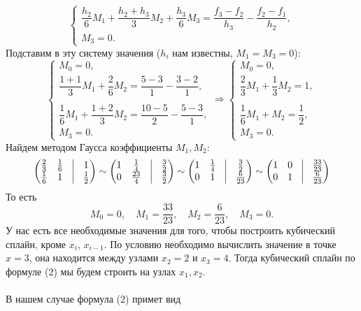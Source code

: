 \documentclass[a4paper, 12pt]{article}
\begin{document}
\begin{enumerate}
$$\begin{cases}
			\dfrac{h_2}{6}M_{1} + \dfrac{h_2 + h_{3}}{3}M_2 + \dfrac{h_{3}}{6}M_{3} = \dfrac{f_{3} - f_2}{h_{3}} - \dfrac{f_2 - f_{1}}{h_2},\\
			M_3 = 0.
		\end{cases}$$
		Подставим в эту систему значения ($h_i$ нам известны, $M_1 = M_3 = 0$):
		$$\begin{cases}
			M_0 = 0,\\
			\dfrac{1 + 1}{3}M_1 + \dfrac{2}{6}M_{2} = \dfrac{5 - 3}{1} - \dfrac{3 - 2}{1},\\\\
			\dfrac{1}{6}M_{1} + \dfrac{1+2}{3}M_2 = \dfrac{10 - 5}{2} - \dfrac{5 - 3}{1},\\
			M_3=0.
		\end{cases}
		\Rightarrow 
		\begin{cases}
			M_0 = 0,\\
			\dfrac{2}{3}M_1 + \dfrac{1}{3}M_{2} = 1,\\\\
			\dfrac{1}{6}M_{1} + M_2 = \dfrac12,\\
			M_3=0.
		\end{cases}$$
		Найдем методом Гаусса коэффициенты $M_1, M_2$:
		$$
		\begin{pmatrix}
			\frac23&\frac16&\vline&1\\
			\frac16&1&\vline&\frac12
		\end{pmatrix}
		\sim
		\begin{pmatrix}
			1&\frac14&\vline&\frac32\\
			0&\frac{23}{4}&\vline&\frac32
		\end{pmatrix}
		\sim 
		\begin{pmatrix}
			1&\frac14&\vline&\frac32\\
			0&1&\vline&\frac{6}{23}
		\end{pmatrix}
		\sim
		\begin{pmatrix}
			1&0&\vline&\frac{33}{23}\\
			0&1&\vline&\frac{6}{23}
		\end{pmatrix}$$
		То есть $$M_0 = 0,\quad M_1 = \dfrac{33}{23},\quad M_2 = \dfrac{6}{23},\quad M_3 = 0.$$
		У нас есть все необходимые значения для того, чтобы построить кубический сплайн, кроме $x_i$, $x_{i-1}$. По условию необходимо вычислить значение в точке $x=3$, она находится между узлами $x_2 = 2$ и $x_3 = 4$. Тогда кубический сплайн по формуле (2) мы будем строить на узлах $x_1, x_2$.\\\\
		В нашем случае формула (2) примет вид 

\end{enumerate}
\end{document}
